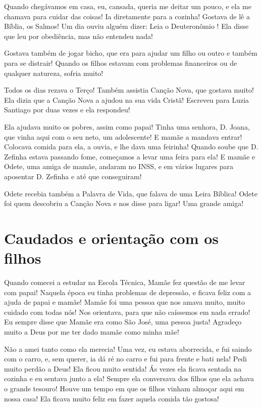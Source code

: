 \documentclass[
  brazil,
  a6paper,
  oneside,
  landscape,
  14pt]{scrbook}
\begin{document}
Quando chegávamos em casa, eu, cansada, queria me deitar um pouco, e ela
me chamava para cuidar das coisas! Ia diretamente para a cozinha!
Gostava de lê a Bíblia, os Salmos! Um dia ouviu alguém dizer: Leia o
Deuteronômio ! Ela disse que leu por obediência, mas não entendeu nada!

Gostava também de jogar bicho, que era para ajudar um filho ou outro e
também para se distrair! Quando os filhos estavam com problemas
financeiros ou de qualquer natureza, sofria muito!

Todos os dias rezava o Terço! Também assistia Canção Nova, que gostava
muito! Ela dizia que a Canção Nova a ajudou na sua vida Cristã! Escreveu
para Luzia Santiago por duas vezes e ela respondeu!

Ela ajudava muito os pobres, assim como papai! Tinha uma senhora, D.
Joana, que vinha aqui com o seu neto, um adolescente! E mamãe a mandava
entrar! Colocava comida para ela, a ouvia, e lhe dava uma feirinha!
Quando soube que D. Zefinha estava passando fome, começamos a levar uma
feira para ela! E mamãe e Odete, uma amiga de mamãe, andaram no INSS, e
em vários lugares para aposentar D. Zefinha e até que conseguiram!

Odete recebia também a Palavra de Vida, que falava de uma Leira Bíblica!
Odete foi quem descobriu a Canção Nova e nos disse para ligar! Uma
grande amiga!

\hypertarget{caudados-e-orientauxe7uxe3o-com-os-filhos}{%
\section{Caudados e orientação com os
filhos}\label{caudados-e-orientauxe7uxe3o-com-os-filhos}}

Quando comecei a estudar na Escola Técnica, Mamãe fez questão de me
levar com papai! Naquela época eu tinha problemas de depressão, e ficava
feliz com a ajuda de papai e mamãe! Mamãe foi uma pessoa que nos amava
muito, muito cuidado com todas nós! Nos orientava, para que não
caíssemos em nada errado! Eu sempre disse que Mamãe era como São José,
uma pessoa justa! Agradeço muito a Deus por me ter dado mamãe como minha
mãe!

Não a amei tanto como ela merecia! Uma vez, eu estava aborrecida, e fui
saindo com o carro, e, sem querer, ia dá ré no carro e fui para frente e
bati nela! Pedi muito perdão a Deus! Ela ficou muito sentida! Ás vezes
ela ficava sentada na cozinha e eu sentava junto a ela! Sempre ela
conversava dos filhos que ela achava o grande tesouro! Houve um tempo em
que os filhos vinham almoçar aqui em nossa casa! Ela ficava muito feliz
em fazer aquela comida tão gostosa!
\end{document}
